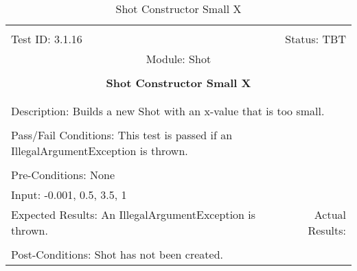 \documentclass[titlepage]{article}
\begin{document}
\begin{center}%
\begin{table}
\begin{tabular}{|l r|}\hline&\\[-2mm]
	Test ID: 3.1.16	&Status: TBT\\[-3mm]
	\multicolumn{2}{|c|}{Module: Shot}\\&\\
	\multicolumn{2}{|c|}{\textbf{\large{Shot Constructor Small X}}}\\&\\\hline&\\[-3mm]
	\multicolumn{2}{|p{\textwidth}|}{Description: Builds a new Shot with an x-value that is too small.}\\[1mm]\hline&\\[-3mm]
	\multicolumn{2}{|p{\textwidth}|}{Pass/Fail Conditions: This test is passed if an IllegalArgumentException is thrown.}\\[1mm]\hline&\\[-3mm]
	\multicolumn{2}{|p{\textwidth}|}{Pre-Conditions: None}\\[4mm]
	\multicolumn{2}{|p{\textwidth}|}{Input: -0.001, 0.5, 3.5, 1}\\[2mm]\hline
	\multicolumn{1}{|p{0.49\textwidth}}{Expected Results: An IllegalArgumentException is thrown.}	&\multicolumn{1}{|p{0.45\textwidth}|}{Actual Results: }\\\hline&\\[-3mm]
	\multicolumn{2}{|p{\textwidth}|}{Post-Conditions: Shot has not been created.}\\\hline
\end{tabular}
\caption{Shot Constructor Small X}
\end{table}
\end{center}
\end{document}
